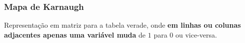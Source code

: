 \documentclass{beamer}
\begin{document}
\begin{frame}
\frametitle{Mapa de Karnaugh}

Representação em matriz para a tabela verade, onde
\textbf{em linhas ou colunas adjacentes apenas uma
variável muda} de $1$ para $0$ ou vice-versa.

\vspace{6pt}

\hspace*{\fill}%
%
%
%

\end{frame}
\end{document}
